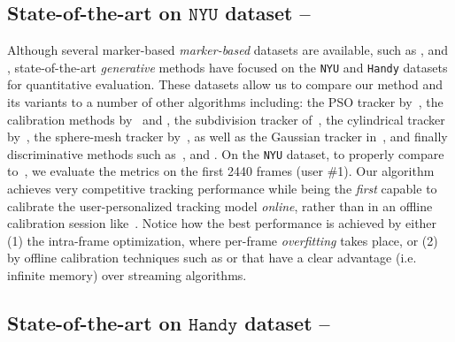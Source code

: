 
\subsection{State-of-the-art on $\texttt{NYU}$ dataset --
}
\label{sec:evalstar}
Although several marker-based \emph{marker-based} datasets are available, such as \cite{qian2014realtime}, \cite{sharp2015accurate} and \cite{yuan2017bighand}, state-of-the-art \emph{generative} methods have focused on the \texttt{NYU} \cite{tompson2014real} and \texttt{Handy} \cite{tkach2016sphere} datasets for quantitative evaluation. These datasets allow us to compare our method and its variants to a number of other algorithms including: the PSO tracker by~\cite{sharp2015accurate}, the calibration methods by~\cite{khamis2015learning} and \cite{tan2016fits}, the subdivision tracker of~\cite{taylor2016joint}, the cylindrical tracker by~\cite{htrack}, the sphere-mesh tracker by~\cite{tkach2016sphere}, as well as the Gaussian tracker in~\cite{sridhar2015fast}, and finally discriminative methods such as~\cite{tompson2014real}, \cite{tang2015opening} and \cite{oberweger2015hands}. 
% 
On the \texttt{NYU} dataset, to properly compare to~\cite{taylor2016joint}, we evaluate the metrics on the first 2440 frames (user \#1). Our algorithm achieves very competitive tracking performance while being the \emph{first} capable to calibrate the user-personalized tracking model \emph{online}, rather than in an offline calibration session like~\cite{taylor2016joint}. 
% 
Notice how the best performance is achieved by either (1) the intra-frame optimization, where per-frame \emph{overfitting} takes place, or (2) by offline calibration techniques such as \OfflineSoft{} or \cite{taylor2016joint} that have a clear advantage (i.e. infinite memory) over streaming algorithms.

\subsection{State-of-the-art on $\texttt{Handy}$ dataset --
}






